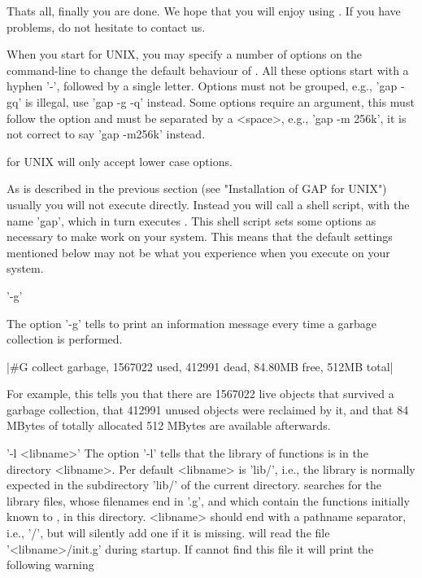 Thats all, finally you are done. We hope that you will enjoy using {\GAP}.
If you have problems, do not hesitate to contact us.

%
%
%

When you start {\GAP}  for UNIX, you may  specify a number of  options on
the command-line to change  the default behaviour  of {\GAP}.  All  these
options  start with a  hyphen '-', followed by a  single letter.  Options
must not be   grouped, e.g.,  'gap  -gq' is   illegal, use   'gap -g  -q'
instead.  Some options  require an argument, this  must follow the option
and  must be separated   by a <space>, e.g.,  'gap   -m 256k', it is  not
correct to say 'gap -m256k' instead.

{\GAP} for UNIX will only accept lower case options.

As  is  described  in  the  previous  section (see "Installation of GAP for
UNIX") usually you will not execute {\GAP} directly. Instead you will call
a  shell script, with the name 'gap',  which in turn executes {\GAP}. This
shell  script sets some options  as necessary to make  {\GAP} work on your
system.  This means  that the  default settings  mentioned below may not be
what you experience when you execute {\GAP} on your system.

'-g'

The  option '-g' tells {\GAP} to print an information message every time a
garbage collection is performed.

|#G  collect garbage, 1567022 used,  412991 dead,  84.80MB free, 512MB total|

For  example,  this  tells  you  that  there  are 1567022 live objects that
survived a garbage collection, that 412991 unused objects were reclaimed by
it,  and  that  84  MBytes  of  totally  allocated 512 MBytes are available
afterwards.

'-l <libname>'
The  option '-l' tells {\GAP} that the  library of {\GAP} functions is in
the directory <libname>. Per default <libname> is 'lib/', i.e., the library
is  normally expected in the subdirectory  'lib/' of the current directory.
{\GAP}  searches for the  library files, whose  filenames end in '.g', and
which  contain the functions initially known to {\GAP}, in this directory.
<libname> should end with a pathname separator, i.e., '/', but {\GAP} will
silently   add  one  if   it  is  missing.   {\GAP}  will  read  the  file
'<libname>/init.g' during startup. If {\GAP} cannot find this file it will
print the following warning

